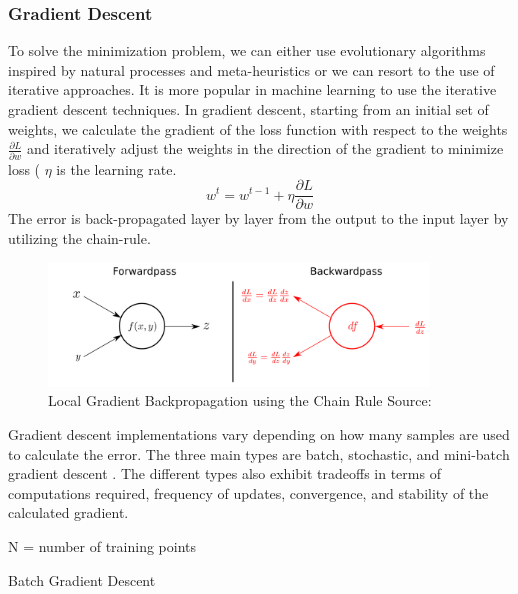 \subsubsection{Gradient Descent}


To solve the minimization problem, we can either use evolutionary algorithms inspired by natural processes and meta-heuristics or we can resort to the use of iterative approaches. It is more popular in machine learning to use the iterative gradient descent techniques. In gradient descent, starting from an initial set of weights, we calculate the gradient of the loss function with respect to the weights  $  \frac{\partial L}{\partial w}  $ and iteratively adjust the weights in the direction of the gradient to minimize loss ( $ \eta $ is the learning rate.
\begin{equation}
 w^{t} = w^{t-1} +  \eta \frac{\partial L}{\partial w} 
\end{equation}
The error is back-propagated layer by layer from the output to the input layer by utilizing the chain-rule.
 
 \begin{figure}[h!]
\centering
\includegraphics[width=0.9\textwidth]{Figures/backprop}
\caption[Local Backpropagation]{ Local Gradient Backpropagation using the Chain Rule Source:\footnotemark} 
\label{fig:Forward and Backward Passs}
\end{figure}


Gradient descent implementations vary depending on how many samples are used to calculate the error. The three main types are batch, stochastic, and mini-batch gradient descent \cite{ruder2016overview}. The different types also exhibit tradeoffs in terms of computations required, frequency of updates, convergence, and stability of the calculated gradient. 

\begin{minipage}{.7\linewidth}
\begin{algorithm}[H]
N = number of training points\;
 \caption{Batch Gradient Descent}
\end{algorithm}
\end{minipage}

